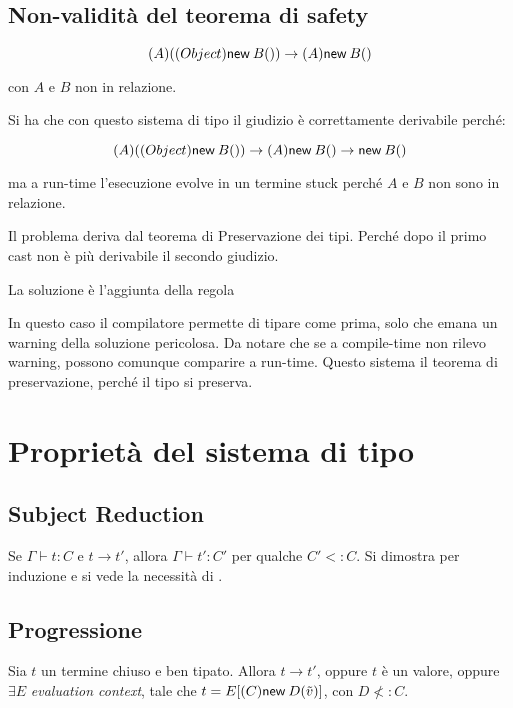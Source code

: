 \subsection{Non-validità del teorema di safety}

$$
(A) ((Object)\new{B}{}) \to (A) \new{B}{}
$$

con $A$ e $B$ non in relazione.

Si ha che con questo sistema di tipo il giudizio è correttamente derivabile perché:

$$
(A) ((Object)\new{B}{}) \to (A) \new{B}{}  \to \new{B}{}
$$

ma a run-time l'esecuzione evolve in un termine stuck perché $A$ e $B$ non sono in relazione.

Il problema deriva dal teorema di Preservazione dei tipi. Perché dopo il primo cast non è più derivabile il secondo giudizio.

La soluzione è l'aggiunta della regola

\begin{prooftree}
	   
\end{prooftree}

In questo caso il compilatore permette di tipare come prima, solo che emana un warning della soluzione pericolosa. 
Da notare che se a compile-time non rilevo warning, possono comunque comparire a run-time.
Questo sistema il teorema di preservazione, perché il tipo si preserva. 


\section{Proprietà del sistema di tipo}

\subsection{Subject Reduction}

Se $\Gamma \vdash t : C$ e $t \to t'$, allora $\Gamma \vdash t' : C'$ per qualche $C' <:C$. Si dimostra per induzione e si vede la necessità di .

\subsection{Progressione}

Sia $t$ un termine chiuso e ben tipato. Allora $t \to t'$, oppure $t$ è un valore, oppure $\exists E$ \textit{evaluation context}, tale che $t = E[(C) \new{D}{\tilde{v}}]$, con $D \not<:C$.

